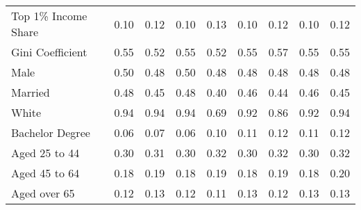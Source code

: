 \documentclass[../Main.tex]{subfiles}
\begin{document}
\begin{table}[htbp]
\begin{tabular}{@{\extracolsep{4pt}}l*{8}{c}}
\multicolumn{1}{l}{Top 1\% Income Share} & \multicolumn{1}{c}{0.10} & \multicolumn{1}{c}{0.12} & \multicolumn{1}{c}{0.10} & \multicolumn{1}{c}{0.13} & \multicolumn{1}{c}{0.10} & \multicolumn{1}{c}{0.12} & \multicolumn{1}{c}{0.10} & \multicolumn{1}{c}{0.12}\\
\multicolumn{1}{l}{Gini Coefficient} & \multicolumn{1}{c}{0.55} & \multicolumn{1}{c}{0.52} & \multicolumn{1}{c}{0.55} & \multicolumn{1}{c}{0.52} & \multicolumn{1}{c}{0.55} & \multicolumn{1}{c}{0.57} & \multicolumn{1}{c}{0.55} & \multicolumn{1}{c}{0.55}\\
\multicolumn{1}{l}{Male} & \multicolumn{1}{c}{0.50} & \multicolumn{1}{c}{0.48} & \multicolumn{1}{c}{0.50} & \multicolumn{1}{c}{0.48} & \multicolumn{1}{c}{0.48} & \multicolumn{1}{c}{0.48} & \multicolumn{1}{c}{0.48} & \multicolumn{1}{c}{0.48}\\
\multicolumn{1}{l}{Married} & \multicolumn{1}{c}{0.48} & \multicolumn{1}{c}{0.45} & \multicolumn{1}{c}{0.48} & \multicolumn{1}{c}{0.40} & \multicolumn{1}{c}{0.46} & \multicolumn{1}{c}{0.44} & \multicolumn{1}{c}{0.46} & \multicolumn{1}{c}{0.45}\\
\multicolumn{1}{l}{White} & \multicolumn{1}{c}{0.94} & \multicolumn{1}{c}{0.94} & \multicolumn{1}{c}{0.94} & \multicolumn{1}{c}{0.69} & \multicolumn{1}{c}{0.92} & \multicolumn{1}{c}{0.86} & \multicolumn{1}{c}{0.92} & \multicolumn{1}{c}{0.94}\\
\multicolumn{1}{l}{Bachelor Degree} & \multicolumn{1}{c}{0.06} & \multicolumn{1}{c}{0.07} & \multicolumn{1}{c}{0.06} & \multicolumn{1}{c}{0.10} & \multicolumn{1}{c}{0.11} & \multicolumn{1}{c}{0.12} & \multicolumn{1}{c}{0.11} & \multicolumn{1}{c}{0.12}\\
\multicolumn{1}{l}{Aged 25 to 44} & \multicolumn{1}{c}{0.30} & \multicolumn{1}{c}{0.31} & \multicolumn{1}{c}{0.30} & \multicolumn{1}{c}{0.32} & \multicolumn{1}{c}{0.30} & \multicolumn{1}{c}{0.32} & \multicolumn{1}{c}{0.30} & \multicolumn{1}{c}{0.32}\\
\multicolumn{1}{l}{Aged 45 to 64} & \multicolumn{1}{c}{0.18} & \multicolumn{1}{c}{0.19} & \multicolumn{1}{c}{0.18} & \multicolumn{1}{c}{0.19} & \multicolumn{1}{c}{0.18} & \multicolumn{1}{c}{0.19} & \multicolumn{1}{c}{0.18} & \multicolumn{1}{c}{0.20}\\
\multicolumn{1}{l}{Aged over 65} & \multicolumn{1}{c}{0.12} & \multicolumn{1}{c}{0.13} & \multicolumn{1}{c}{0.12} & \multicolumn{1}{c}{0.11} & \multicolumn{1}{c}{0.13} & \multicolumn{1}{c}{0.12} & \multicolumn{1}{c}{0.13} & \multicolumn{1}{c}{0.13}\\

\end{tabular}
\end{table}
\end{document}
